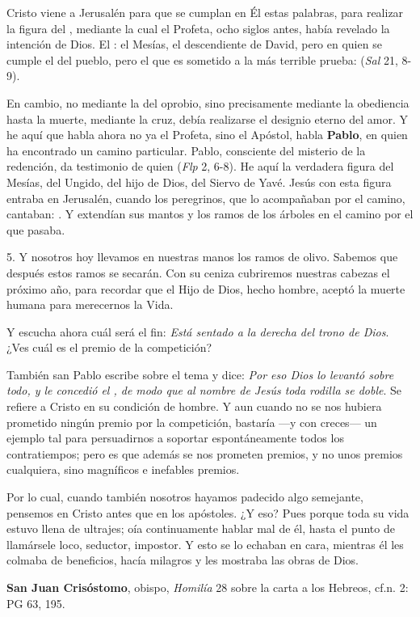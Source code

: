 \begin{body}
Cristo viene a Jerusalén para que se cumplan en Él estas palabras, para realizar la figura del , mediante la cual el Profeta, ocho siglos antes, había revelado la intención de Dios. El : el Mesías, el descendiente de David, pero en quien se cumple el  del pueblo, pero el que es sometido a la más terrible prueba:  (\textit{Sal} 21, 8-9).

En cambio, no mediante la  del oprobio, sino precisamente mediante la obediencia hasta la muerte, mediante la cruz, debía realizarse el designio eterno del amor. Y he aquí que habla ahora no ya el Profeta, sino el Apóstol, habla \textbf{Pablo}, en quien  ha encontrado un camino particular. Pablo, consciente del misterio de la redención, da testimonio de quien  (\textit{Flp} 2, 6-8). He aquí la verdadera figura del Mesías, del Ungido, del hijo de Dios, del Siervo de Yavé. Jesús con esta figura entraba en Jerusalén, cuando los peregrinos, que lo acompañaban por el camino, cantaban: . Y extendían sus mantos y los ramos de los árboles en el camino por el que pasaba.

5. Y nosotros hoy llevamos en nuestras manos los ramos de olivo. Sabemos que después estos ramos se secarán. Con su ceniza cubriremos nuestras cabezas el próximo año, para recordar que el Hijo de Dios, hecho hombre, aceptó la muerte humana para merecernos la Vida.
\end{body}

\label{b2-04-01-1979H}

\begin{patercite}
[\ldots] Y escucha ahora cuál será el fin: \textit{Está sentado a la derecha del trono de Dios}. ¿Ves cuál es el premio de la competición?

También san Pablo escribe sobre el tema y dice: \textit{Por eso Dios lo	levantó sobre todo, y le concedió el , de modo que al nombre de Jesús toda rodilla se doble}. Se refiere a Cristo en su condición de hombre. Y aun cuando no se nos hubiera prometido ningún	premio por la competición, bastaría ---y con creces--- un ejemplo tal para persuadirnos a soportar espontáneamente todos los contratiempos; pero es que además se nos prometen premios, y no unos premios	cualquiera, sino magníficos e inefables premios.

Por lo cual, cuando también nosotros hayamos padecido algo semejante, pensemos en Cristo antes que en los apóstoles. ¿Y eso? Pues porque toda su vida estuvo llena de ultrajes; oía continuamente hablar mal de él, hasta el punto de llamársele loco, seductor, impostor. Y esto se lo echaban en cara, mientras él les colmaba de beneficios, hacía milagros y les mostraba las obras de Dios.

\textbf{San Juan Crisóstomo}, obispo, \textit{Homilía} 28 sobre la carta a los	Hebreos, cf.n. 2: PG 63, 195.
\end{patercite}

